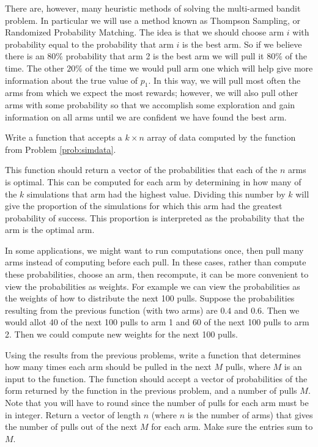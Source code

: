 There are, however, many heuristic methods of solving the multi-armed bandit problem.
In particular we will use a method known as Thompson Sampling, or Randomized Probability Matching.
The idea is that we should choose arm $i$ with probability equal to the probability
that arm $i$ is the best arm.  So if we believe there is an $80\%$ probability that
arm 2 is the best arm we will pull it $80\%$ of the time.  The other $20\%$ of the
time we would pull arm one which will help give more information about the true value of $p_1$.
In this way, we will pull most often the arms from which we expect the most rewards;
however, we will also pull other arms with some probability so that we accomplish some
exploration and gain information on all arms until we are confident we have found the best arm.

\begin{problem}
Write a function that accepts a $k \times n$ array of data computed by the function from Problem 
\ref{prob:simdata}.

This function should return a vector of the probabilities that each of the $n$ arms is optimal.
This can be computed for each arm by determining in how many of the $k$ simulations
that arm had the highest value.  Dividing this number by $k$ will give the proportion
of the simulations for which this arm had the greatest probability of success.
This proportion is interpreted as the probability that the arm is the optimal arm.
\end{problem}

In some applications, we might want to run computations once, then pull many arms instead
of computing before each pull.  In these cases, rather than compute these probabilities,
choose an arm, then recompute, it can be more convenient to view the probabilities as weights.
For example we can view the probabilities as the weights of how to distribute the next 100 pulls.
Suppose the probabilities resulting from the previous function (with two arms) are $0.4$ and $0.6$.
Then we would allot 40 of the next 100 pulls to arm 1 and 60 of the next 100 pulls to arm 2.
Then we could compute new weights for the next 100 pulls.

\begin{problem}
Using the results from the previous problems, write a function that determines how many
times each arm should be pulled in the next $M$ pulls, where $M$ is an input to the function.
The function should accept a vector of probabilities of the form returned by the
function in the previous problem, and a number of pulls $M$.
Note that you will have to round since the number of pulls for each arm must be in integer.
Return a vector of length $n$ (where $n$ is the number of arms) that gives the number of
pulls out of the next $M$ for each arm.  Make sure the entries sum to $M$.
\end{problem}

